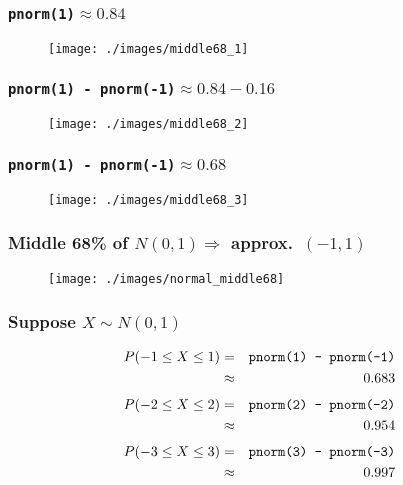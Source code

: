 
\begin{frame}
\frametitle{\texttt{pnorm(1)}$\approx 0.84$}

\begin{figure}
\texttt{[image: ./images/middle68\_1]}
\end{figure}
\end{frame}
\begin{frame}
\frametitle{\texttt{pnorm(1) - pnorm(-1)}$\approx 0.84 - 0.16$}
\begin{figure}
\texttt{[image: ./images/middle68\_2]}
\end{figure}
\end{frame}
\begin{frame}
\frametitle{\texttt{pnorm(1) - pnorm(-1)}$\approx 0.68$}
\begin{figure}
\texttt{[image: ./images/middle68\_3]}
\end{figure}
\end{frame}

\begin{frame}
\frametitle{Middle 68\% of $N(0,1) \Rightarrow$ approx.\ $(-1,1)$}
\begin{figure}
\texttt{[image: ./images/normal\_middle68]}
\end{figure}
\end{frame}

\begin{frame}
\frametitle{Suppose $X \sim N(0,1)$}
\begin{eqnarray*}
	P(-1 \leq X \leq 1) &=& \mbox{\texttt{pnorm(1) - pnorm(-1)}}\\
		&\approx& 0.683
\end{eqnarray*}
\begin{eqnarray*}
	P(-2 \leq X \leq 2) &=& \mbox{\texttt{pnorm(2) - pnorm(-2)}}\\
		&\approx& 0.954
\end{eqnarray*}
\begin{eqnarray*}
	P(-3 \leq X \leq 3) &=& \mbox{\texttt{pnorm(3) - pnorm(-3)}}\\
		&\approx& 0.997
\end{eqnarray*}

\end{frame}
